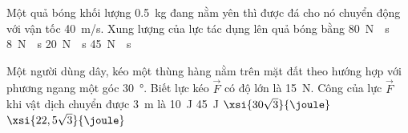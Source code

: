 \begin{ex}
	Một quả bóng khối lượng \SI{0.5}{\kilogram} đang nằm yên thì được đá cho nó chuyển động với vận tốc \SI{40}{\meter/\second}. Xung lượng của lực tác dụng lên quả bóng bằng
	\choice
	{\SI{80}{\newton\cdot\second}}
	{\SI{8}{\newton\cdot\second}}
	{\True \SI{20}{\newton\cdot\second}}
	{\SI{45}{\newton\cdot\second}}
	\loigiai{}
\end{ex}
\begin{ex}
	Một người dùng dây, kéo một thùng hàng nằm trên mặt đất theo hướng hợp với phương ngang một góc \SI{30}{\degree}. Biết lực kéo $\vec{F}$ có độ lớn là \SI{15}{\newton}. Công của lực $\vec{F}$ khi vật dịch chuyển được \SI{3}{\meter} là
	\choice
	{\SI{10}{\joule}}
	{\SI{45}{\joule}}
	{$\xsi{30\sqrt{3}}{\joule}$}
	{\True $\xsi{22,5\sqrt{3}}{\joule}$}
	\loigiai{}
\end{ex}

